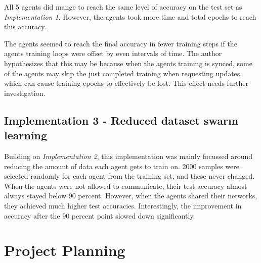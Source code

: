 \documentclass[12pt,a4paper,titlepage]{report}
\begin{document}
	All 5 agents did mange to reach the same level of accuracy on the test set as \emph{Implementation 1}. However, the agents took more time and total epochs to reach this accuracy.
	
	The agents seemed to reach the final accuracy in fewer training steps if the agents training loops were offset by even intervals of time. The author hypothesizes that this may be because when the agents training is synced, some of the agents may skip the just completed training when requesting updates, which can cause training epochs to effectively be lost. This effect needs further investigation.
	\section{Implementation 3 - Reduced dataset swarm learning}
	Building on \emph{Implementation 2}, this implementation was mainly focussed around reducing the amount of data each agent gets to train on. 2000 samples were selected randomly for each agent from the training set, and these never changed. When the agents were not allowed to communicate, their test accuracy almost always stayed below 90 percent. However, when the agents shared their networks, they achieved much higher test accuracies. Interestingly, the improvement in accuracy after the 90 percent point slowed down significantly.
	
	\chapter{Project Planning}
\end{document}
